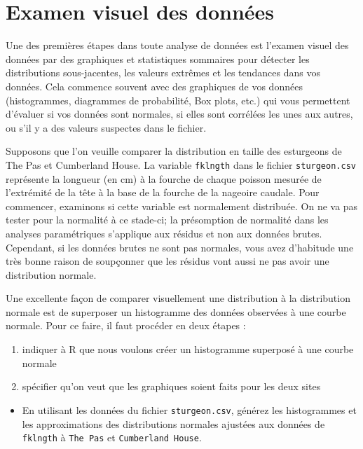 \documentclass[
  12pt,
]{book}
\providecommand{\tightlist}{%
  \setlength{\itemsep}{0pt}\setlength{\parskip}{0pt}}
\begin{document}
\hypertarget{examen-visuel-des-donnuxe9es}{%
\section{Examen visuel des données}\label{examen-visuel-des-donnuxe9es}}

Une des premières étapes dans toute analyse de données est l'examen visuel des données par des graphiques et statistiques sommaires pour détecter les distributions sous-jacentes, les valeurs extrêmes et les tendances dans vos données. Cela commence souvent avec des graphiques de vos données (histogrammes, diagrammes de probabilité, Box plots, etc.) qui vous permettent d'évaluer si vos données sont normales, si elles sont corrélées les unes aux autres, ou s'il y a des valeurs suspectes dans le fichier.

Supposons que l'on veuille comparer la distribution en taille des esturgeons de The Pas et Cumberland House. La variable \texttt{fklngth} dans le fichier \texttt{sturgeon.csv} représente la longueur (en cm) à la fourche de chaque poisson mesurée de l'extrémité de la tête à la base de la fourche de la nageoire caudale. Pour commencer, examinons si cette variable est normalement distribuée. On ne va pas tester pour la normalité à ce stade-ci; la présomption de normalité dans les analyses paramétriques s'applique aux résidus et non aux données brutes. Cependant, si les données brutes ne sont pas normales, vous avez d'habitude une très bonne raison de soupçonner que les résidus vont aussi ne pas avoir une distribution normale.

Une excellente façon de comparer visuellement une distribution à la distribution normale est de superposer un histogramme des données observées à une courbe normale. Pour ce faire, il faut procéder en deux étapes :

\begin{enumerate}
\def\labelenumi{\arabic{enumi}.}
\tightlist
\item
  indiquer à R que nous voulons créer un histogramme superposé à une courbe normale
\item
  spécifier qu'on veut que les graphiques soient faits pour les deux sites
\end{enumerate}

\begin{itemize}
\tightlist
\item
  En utilisant les données du fichier \texttt{sturgeon.csv}, générez les histogrammes et les approximations des distributions normales ajustées aux données de \texttt{fklngth} à \texttt{The\ Pas} et \texttt{Cumberland\ House}.
\end{itemize}
\end{document}
